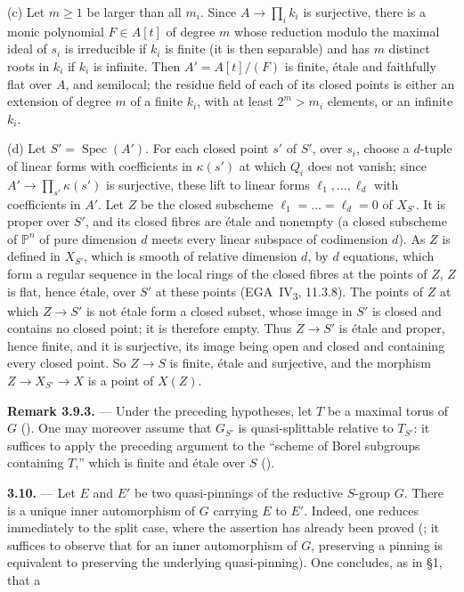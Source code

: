 (c) Let \(m\geq1\) be larger than all \(m_i\). Since \(A\to\prod_ik_i\) is surjective, there is a monic
polynomial \(F\in A[t]\) of degree \(m\) whose reduction modulo the maximal ideal of \(s_i\) is
irreducible if \(k_i\) is finite (it is then separable) and has \(m\) distinct roots in \(k_i\) if \(k_i\)
is infinite. Then \(A'=A[t]/(F)\) is finite, étale and faithfully flat over \(A\), and semilocal; the
residue field of each of its closed points is either an extension of degree \(m\) of a finite
\(k_i\), with at least \(2^m>m_i\) elements, or an infinite \(k_i\).

(d) Let \(S'=\operatorname{Spec}(A')\). For each closed point \(s'\) of \(S'\), over \(s_i\), choose a
\(d\)-tuple of linear forms with coefficients in \(\kappa(s')\) at which \(Q_i\) does not vanish;
since \(A'\to\prod_{s'}\kappa(s')\) is surjective, these lift to linear forms
\(\ell_1,\dots,\ell_d\) with coefficients in \(A'\). Let \(Z\) be the closed subscheme
\(\ell_1=\dots=\ell_d=0\) of \(X_{S'}\). It is proper over \(S'\), and its closed fibres are étale and
nonempty (a closed subscheme of \(\mathbb P^n\) of pure dimension \(d\) meets every linear subspace of
codimension \(d\)). As \(Z\) is defined in \(X_{S'}\), which is smooth of relative dimension \(d\), by
\(d\) equations, which form a regular sequence in the local rings of the closed fibres at the points
of \(Z\), \(Z\) is flat, hence étale, over \(S'\) at these points (EGA~IV\textsubscript{3}, 11.3.8). The
points of \(Z\) at which \(Z\to S'\) is not étale form a closed subset, whose image in \(S'\) is closed
and contains no closed point; it is therefore empty. Thus \(Z\to S'\) is étale and proper, hence
finite, and it is surjective, its image being open and closed and containing every closed point.
So \(Z\to S\) is finite, étale and surjective, and the morphism \(Z\to X_{S'}\to X\) is a point of
\(X(Z)\).

\medskip\noindent\textbf{Remark 3.9.3.} ---
Under the preceding hypotheses, let \(T\) be a maximal torus of
\(G\) (). One may moreover assume that \(G_{S'}\)
is quasi-splittable relative to \(T_{S'}\): it suffices to apply the
preceding argument to the ``scheme of Borel subgroups containing
\(T\),'' which is finite and étale over \(S\)
().

\medskip\noindent\textbf{3.10.} ---
Let \(E\) and \(E'\) be two quasi-pinnings of the reductive
\(S\)-group \(G\). There is a unique inner automorphism of \(G\)
carrying \(E\) to \(E'\). Indeed, one reduces immediately to the
split case, where the assertion has already been proved (; it
suffices to observe that for an inner automorphism of \(G\), preserving
a pinning is equivalent to preserving the underlying quasi-pinning).
One concludes, as in \S1, that a


